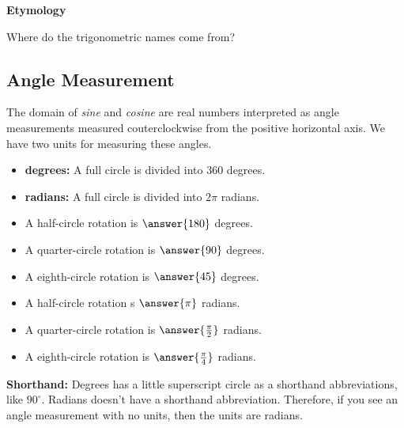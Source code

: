 \documentclass{ximera}
\begin{document}
\begin{remark}  \textbf{\textcolor{yellow!35!black}{Etymology}}


Where do the trigonometric names come from?  

\end{remark}








\newpage

\subsection*{Angle Measurement}
\hfill\break

The domain of \textit{sine} and \textit{cosine} are real numbers interpreted as angle measurements measured couterclockwise from the positive horizontal axis.  We have two units for measuring these angles.


\begin{itemize}
\item \textbf{degrees:}  A full circle is divided into $360$ degrees.
\item \textbf{radians:}  A full circle is divided into $2\pi$ radians.
\end{itemize}


\begin{question} 


  \begin{itemize}
    \item A half-circle rotation is $\answer{180}$ degrees.
    \item A quarter-circle rotation is $\answer{90}$ degrees.
    \item A eighth-circle rotation is $\answer{45}$ degrees.
    \item A half-circle rotation s $\answer{\pi}$ radians.
    \item A quarter-circle rotation is $\answer{\frac{\pi}{2}}$ radians.
    \item A eighth-circle rotation is $\answer{\frac{\pi}{4}}$ radians.

  \end{itemize}
\end{question}


\textbf{Shorthand:}  Degrees has a little superscript circle as a shorthand abbreviations, like $90^\circ$.  Radians doesn't have a shorthand abbreviation.  Therefore, if you see an angle measurement with no units, then the units are radians. 
\end{document}
